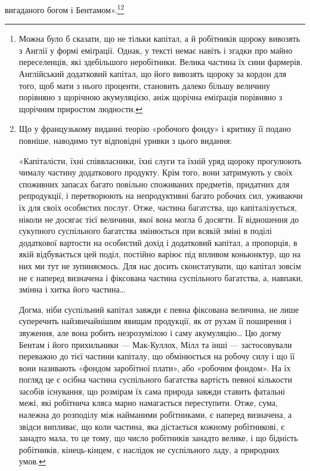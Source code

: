 вигаданого богом і Бентамом».\footnote{
Можна було б сказати, що не тільки капітал, а й робітників щороку
вивозять з Англії у формі еміґрації. Однак, у тексті немає навіть і згадки
про майно переселенців, які здебільшого неробітники. Велика частина
їх сини фармерів. Англійський додатковий капітал, що його вивозять
щороку за кордон для того, щоб мати з нього проценти, становить далеко
більшу величину порівняно з щорічною акумуляцією, аніж щорічна
еміґрація порівняно з щорічним приростом людности.
}\footnote*{
Що у французькому виданні теорію «робочого фонду» і критику
її подано повніше, наводимо тут відповідні уривки з цього видання:

«Капіталісти, їхні співвласники, їхні слуги та їхній уряд щороку
прогулюють чималу частину додаткового продукту. Крім того, вони
затримують у своїх споживних запасах багато повільно споживаних
предметів, придатних для репродукції, і перетворюють на непродуктивні
багато робочих сил, уживаючи їх для своїх особистих послуг.
Отже, частина багатства, що капіталізується, ніколи не досягає тієї
величини, якої вона могла б досягти. Її відношення до сукупного суспільного
багатства змінюється при всякій зміні в поділі додаткової вартости
на особистий дохід і додатковий капітал, а пропорція, в якій відбувається
цей поділ, постійно варіює під впливом коньюнктур, що на них ми
тут не зупиняємось. Для нас досить сконстатувати, що капітал зовсім
не є наперед визначена і фіксована частина суспільного багатства, а,
навпаки, змінна і хитка його частина\dots{}

Догма, ніби суспільний капітал завжди є певна фіксована величина,
не лише суперечить найзвичайнішим явищам продукції, як от рухам її
поширення і звуження, але вона робить незрозумілою і саму акумуляцію\dots{}
Цю догму Бентам і його прихильники — Мак-Куллох, Мілл та інші —
застосовували переважно до тієї частини капіталу, що обмінюється на
робочу силу і що її вони називають «фондом заробітної плати», або «робочим
фондом». На їх погляд це є осібна частина суспільного багатства
вартість певної кількости засобів існування, що розмірам їх сама природа
завжди ставить фатальні межі, які робітнича кляса марно намагається
переступити. Отже, сума, належна до розподілу між найманими робітниками,
є наперед визначена, а звідси випливає, що коли частина, яка
дістається кожному робітникові, є занадто мала, то це тому, що число
робітників занадто велике, і що бідність робітників, кінець-кінцем,
є наслідок не суспільного ладу, а природних умов.

}
